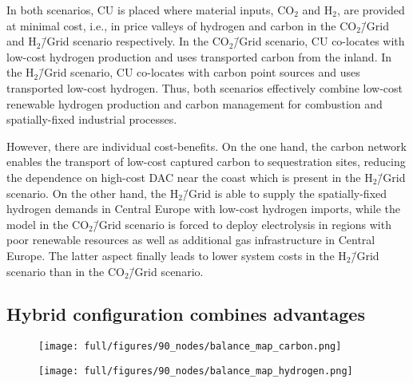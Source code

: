 \documentclass[twocolumn]{article}
\newcommand{\carbon}{CO$_2$}
\newcommand{\hydrogen}{H$_2$}
\newcommand{\carbongrid}{CO$_2$\=/Grid}
\newcommand{\hydrogengrid}{H$_2$\=/Grid}
\newcommand{\carbonscenario}{CO$_2$\=/Grid scenario}
\newcommand{\hydrogenscenario}{H$_2$\=/Grid scenario}
\newcommand{\hybridscenario}{Hybrid scenario}
\begin{document}
In both scenarios, CU is placed where material inputs, \carbon{} and \hydrogen{}, are provided at minimal cost, i.e., in price valleys of hydrogen and carbon in the \carbongrid{} and \hydrogenscenario{} respectively. In the \carbonscenario{}, CU co-locates with low-cost hydrogen production and uses transported carbon from the inland. In the \hydrogenscenario{}, CU co-locates with carbon point sources and uses transported low-cost hydrogen.
Thus, both scenarios effectively combine low-cost renewable hydrogen production and carbon management for combustion and spatially-fixed industrial processes.

However, there are individual cost-benefits. On the one hand, the carbon network enables the transport of low-cost captured carbon to sequestration sites, reducing the dependence on high-cost DAC near the coast which is present in the \hydrogenscenario{}. On the other hand, the \hydrogengrid{} is able to supply the spatially-fixed hydrogen demands in Central Europe with low-cost hydrogen imports, while the model in the \carbonscenario{} is forced to deploy electrolysis in regions with poor renewable resources as well as additional gas infrastructure in Central Europe. The latter aspect finally leads to lower system costs in the \hydrogenscenario{} than in the \carbonscenario{}.



\subsection*{Hybrid configuration combines advantages}\label{subsec:Hybrid}


\begin{figure*}[ht!]
    \centering
    \begin{subfigure}{.5\textwidth}
        \centering
        \texttt{[image: full/figures/90\_nodes/balance\_map\_carbon.png]}
        \label{fig:balance_map_carbon_full}
    \end{subfigure}%
    \begin{subfigure}{.5\textwidth}
        \centering
        \texttt{[image: full/figures/90\_nodes/balance\_map\_hydrogen.png]}
        \label{fig:balance_map_hydrogen_full}
    \end{subfigure}
    \caption{Average operation, flows and prices of the carbon (left) and hydrogen (right) sectors in the \hybridscenario{} assuming net \carbon{} neutrality. For each region, upper semicircles show the average production per technology, lower semicircles the consumption, and colors the average marginal prices. Carbon Sequestration offshore is drawn in full circles. Lines and arrows show interregional transportation. Carbon from point-source in the inland either supplies local CU with imported hydrogen or facilitates sequestration in nearby offshore regions.
    }
    \label{fig:balance_map_full}
\end{figure*}
\end{document}
